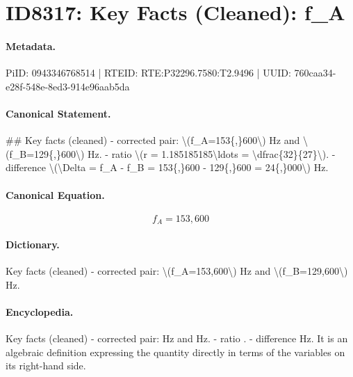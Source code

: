 \section*{ID8317: Key Facts (Cleaned): f\_A}
\paragraph{Metadata.}
PiID: 0943346768514 | RTEID: RTE:P32296.7580:T2.9496 | UUID: 760caa34-e28f-548e-8ed3-914e96aab5da

\paragraph{Canonical Statement.}
\#\# Key facts (cleaned) - corrected pair: \textbackslash{}(f\_A=153\{,\}600\textbackslash{}) Hz and \textbackslash{}(f\_B=129\{,\}600\textbackslash{}) Hz. - ratio \textbackslash{}(r = 1.185185185\textbackslash{}ldots = \textbackslash{}dfrac\{32\}\{27\}\textbackslash{}). - difference \textbackslash{}(\textbackslash{}Delta = f\_A - f\_B = 153\{,\}600 - 129\{,\}600 = 24\{,\}000\textbackslash{}) Hz.

\paragraph{Canonical Equation.}
\[
f_A=153{,}600
\]

\paragraph{Dictionary.}
Key facts (cleaned) - corrected pair: \textbackslash{}(f\_A=153,600\textbackslash{}) Hz and \textbackslash{}(f\_B=129,600\textbackslash{}) Hz.

\paragraph{Encyclopedia.}
Key facts (cleaned) - corrected pair: Hz and Hz. - ratio . - difference Hz. It is an algebraic definition expressing the quantity directly in terms of the variables on its right-hand side.
